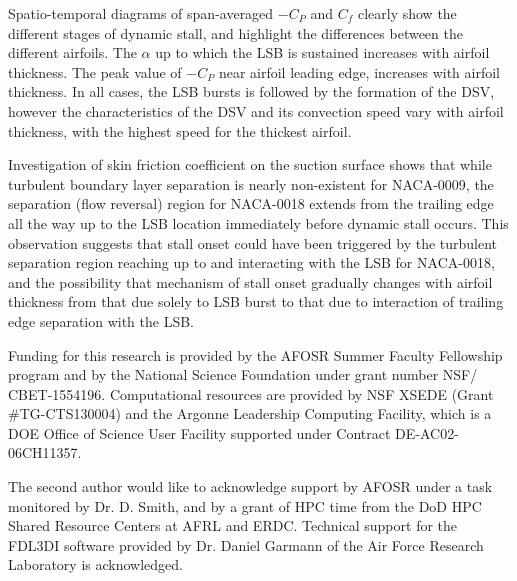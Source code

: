 \documentclass[aps,pra,preprint,groupedaddress]{revtex4-1}
\renewcommand{\=}[1]{\stackrel{#1}{=}} %
\begin{document}
Spatio-temporal diagrams of span-averaged $-C_P$ and $C_f$ clearly show the
different stages of dynamic stall, and highlight the differences between the
different airfoils. The $\alpha$ up to which the LSB is sustained increases
with airfoil thickness. The peak value of $-C_P$ near airfoil leading edge,
increases with airfoil thickness. In all cases, the LSB bursts is followed by
the formation of the DSV, however the characteristics of the DSV and its
convection speed vary with airfoil thickness, with the highest speed for the
thickest airfoil.

Investigation of skin friction coefficient on the suction surface shows that
while turbulent boundary layer separation is nearly non-existent for NACA-0009,
the separation (flow reversal) region for NACA-0018 extends from the trailing
edge all the way up to the LSB location immediately before dynamic stall
occurs. This observation suggests that stall onset could have been triggered by
the turbulent separation region reaching up to and interacting with the LSB for
NACA-0018, and the possibility that mechanism of stall onset gradually changes
with airfoil thickness from that due solely to LSB burst to that due to
interaction of trailing edge separation with the LSB.

\begin{acknowledgments}
\label{sec:acknowledgement}
Funding for this research is provided by the AFOSR Summer Faculty Fellowship
program and by the National Science Foundation under grant number NSF/
CBET-1554196. Computational resources are provided by NSF XSEDE (Grant
\#TG-CTS130004) and the Argonne Leadership Computing Facility, which is a DOE
Office of Science User Facility supported under Contract DE-AC02-06CH11357. 

The second author would like to acknowledge support by AFOSR under a task
monitored by Dr. D. Smith, and by a grant of HPC time from the DoD HPC Shared
Resource Centers at AFRL and ERDC. Technical support for the FDL3DI software
provided by Dr. Daniel Garmann of the Air Force Research Laboratory is
acknowledged.
\end{acknowledgments}


%


\end{document}
